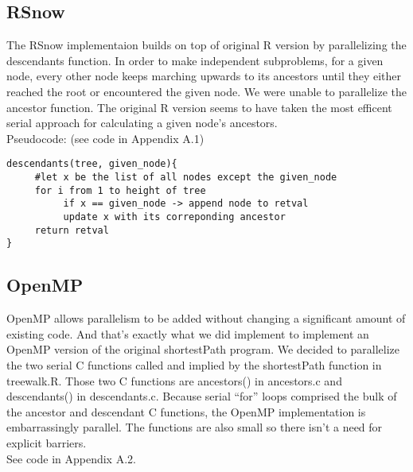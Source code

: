 \documentclass[11pt,letterpaper]{article}
\begin{document}
\newpage

\subsection{RSnow}
The RSnow implementaion builds on top of original R version by parallelizing the descendants function. 
In order to make independent subproblems, for a given node, every other node keeps marching upwards to its ancestors until they either reached the root or encountered the given node. 
We were unable to parallelize the ancestor function. The original R version seems to have taken the most efficent serial approach for calculating a given node's ancestors. \\

Pseudocode: (see code in Appendix A.1)
\begin{lstlisting}[style=MyR]
descendants(tree, given_node){
     #let x be the list of all nodes except the given_node
     for i from 1 to height of tree
          if x == given_node -> append node to retval
          update x with its correponding ancestor
     return retval
}
\end{lstlisting}

\subsection{OpenMP}
OpenMP allows parallelism to be added without changing a significant amount of existing code. And that's exactly what we did implement to implement an OpenMP version of the original shortestPath program. 
We decided to parallelize the two serial C functions called and implied by the shortestPath function in treewalk.R.
Those two C functions are ancestors() in ancestors.c and descendants() in descendants.c. 
Because serial “for” loops comprised the bulk of the ancestor and descendant C functions, the OpenMP implementation is embarrassingly parallel. The functions are also small so there isn't a need for explicit barriers.\\

See code in Appendix A.2.\\
\end{document}
